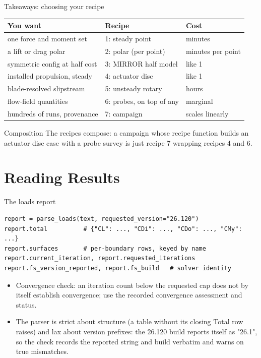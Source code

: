 \documentclass[aspectratio=169,10pt]{beamer}
\begin{document}
\begin{frame}{Takeaways: choosing your recipe}
  \small
  \begin{tabular}{@{}lll@{}}
    \toprule
    You want & Recipe & Cost \\
    \midrule
    one force and moment set & 1: steady point & minutes \\
    a lift or drag polar & 2: polar (per point) & minutes per point \\
    symmetric config at half cost & 3: MIRROR half model & like 1 \\
    installed propulsion, steady & 4: actuator disc & like 1 \\
    blade-resolved slipstream & 5: unsteady rotary & hours \\
    flow-field quantities & 6: probes, on top of any & marginal \\
    hundreds of runs, provenance & 7: campaign & scales linearly \\
    \bottomrule
  \end{tabular}
  \vspace{2mm}
  \begin{block}{Composition}
    The recipes compose: a campaign whose recipe function builds an actuator disc case with a probe survey is just recipe 7 wrapping recipes 4 and 6.
  \end{block}
\end{frame}

\section{Reading Results}

\begin{frame}[fragile]{The loads report}
\begin{lstlisting}
report = parse_loads(text, requested_version="26.120")
report.total          # {"CL": ..., "CDi": ..., "CDo": ..., "CMy": ...}
report.surfaces       # per-boundary rows, keyed by name
report.current_iteration, report.requested_iterations
report.fs_version_reported, report.fs_build   # solver identity
\end{lstlisting}
  \begin{itemize}
    \item Convergence check: an iteration count below the requested cap does not by itself establish convergence; use the recorded convergence assessment and status.
    \item The parser is strict about structure (a table without its closing Total row raises) and lax about version prefixes: the 26.120 build reports itself as "26.1", so the check records the reported string and build verbatim and warns on true mismatches.
  \end{itemize}
\end{frame}
\end{document}
